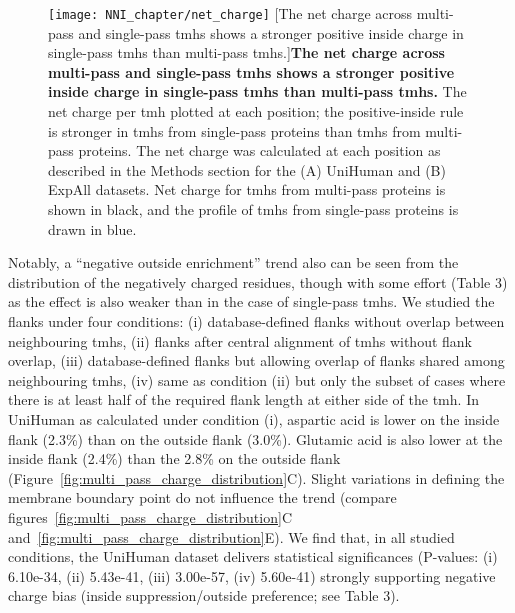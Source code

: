 \begin{figure}[!ht]
\centering
\texttt{[image: NNI\_chapter/net\_charge]}
[The net charge across multi-pass and single-pass \gls{tmh}s shows a stronger positive inside charge in single-pass \gls{tmh}s than multi-pass \gls{tmh}s.]{\textbf{The net charge across multi-pass and single-pass \gls{tmh}s shows a stronger positive inside charge in single-pass \gls{tmh}s than multi-pass \gls{tmh}s.}
The net charge per \gls{tmh} plotted at each position; the positive-inside rule is stronger in \gls{tmh}s from single-pass proteins than \gls{tmh}s from multi-pass proteins. The net charge was calculated at each position as described in the Methods section for the (A) UniHuman and (B) ExpAll datasets. Net charge for \gls{tmh}s from multi-pass proteins is shown in black, and the profile of \gls{tmh}s from single-pass proteins is drawn in blue.}

\label{fig:net_charge}
\end{figure}

Notably, a ``negative outside enrichment'' trend also can be seen from the distribution of the negatively charged residues, though with some effort (Table 3) as the effect is also weaker than in the case of single-pass \gls{tmh}s. We studied the flanks under four conditions: (i) database-defined flanks without overlap between neighbouring \gls{tmh}s, (ii) flanks after central alignment of \gls{tmh}s without flank overlap, (iii) database-defined flanks but allowing overlap of flanks shared among neighbouring \gls{tmh}s, (iv) same as condition (ii) but only the subset of cases where there is at least half of the required flank length at either side of the \gls{tmh}. In UniHuman as calculated under condition (i), aspartic acid is lower on the inside flank (2.3\%) than on the outside flank (3.0\%). Glutamic acid is also lower at the inside flank (2.4\%) than the 2.8\% on the outside flank (Figure~\ref{fig:multi_pass_charge_distribution}C). Slight variations in defining the membrane boundary point do not influence the trend (compare figures~\ref{fig:multi_pass_charge_distribution}C and~\ref{fig:multi_pass_charge_distribution}E). We find that, in all studied conditions, the UniHuman dataset delivers statistical significances (P-values: (i) 6.10e-34, (ii) 5.43e-41, (iii) 3.00e-57, (iv) 5.60e-41) strongly supporting negative charge bias (inside suppression/outside preference; see Table 3).

